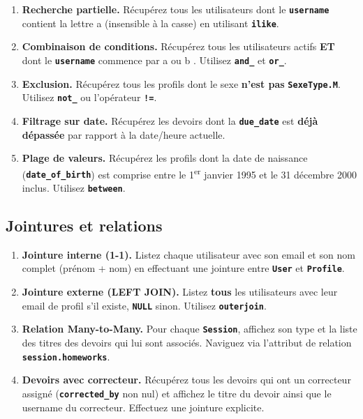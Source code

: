 \documentclass[12pt,a4paper]{article}
\newcommand{\kw}[1]{\texttt{\textbf{#1}}}
\begin{document}
\begin{mdframed}[style=exercice]
\begin{enumerate}[label=\textbf{Q\arabic*.},start=6]
    \item \textbf{Recherche partielle.} Récupérez tous les utilisateurs dont le \kw{username} contient la lettre \og a \fg{} (insensible à la casse) en utilisant \kw{ilike}.

    \item \textbf{Combinaison de conditions.} Récupérez tous les utilisateurs actifs \textbf{ET} dont le \kw{username} commence par \og a \fg{} ou \og b \fg{}. Utilisez \kw{and\_} et \kw{or\_}.

    \item \textbf{Exclusion.} Récupérez tous les profils dont le sexe \textbf{n'est pas} \kw{SexeType.M}. Utilisez \kw{not\_} ou l'opérateur \kw{!=}.

    \item \textbf{Filtrage sur date.} Récupérez les devoirs dont la \kw{due\_date} est \textbf{déjà dépassée} par rapport à la date/heure actuelle.

    \item \textbf{Plage de valeurs.} Récupérez les profils dont la date de naissance (\kw{date\_of\_birth}) est comprise entre le 1\textsuperscript{er} janvier 1995 et le 31 décembre 2000 inclus. Utilisez \kw{between}.
\end{enumerate}
\end{mdframed}

\subsection{Jointures et relations}

\begin{mdframed}[style=exercice]
\begin{enumerate}[label=\textbf{Q\arabic*.},start=11]
    \item \textbf{Jointure interne (1-1).} Listez chaque utilisateur avec son email et son nom complet (prénom + nom) en effectuant une jointure entre \kw{User} et \kw{Profile}.

    \item \textbf{Jointure externe (LEFT JOIN).} Listez \textbf{tous} les utilisateurs avec leur email de profil s'il existe, \kw{NULL} sinon. Utilisez \kw{outerjoin}.

    \item \textbf{Relation Many-to-Many.} Pour chaque \kw{Session}, affichez son type et la liste des titres des devoirs qui lui sont associés. Naviguez via l'attribut de relation \kw{session.homeworks}.

    \item \textbf{Devoirs avec correcteur.} Récupérez tous les devoirs qui ont un correcteur assigné (\kw{corrected\_by} non nul) et affichez le titre du devoir ainsi que le username du correcteur. Effectuez une jointure explicite.
\end{enumerate}
\end{mdframed}
\end{document}

